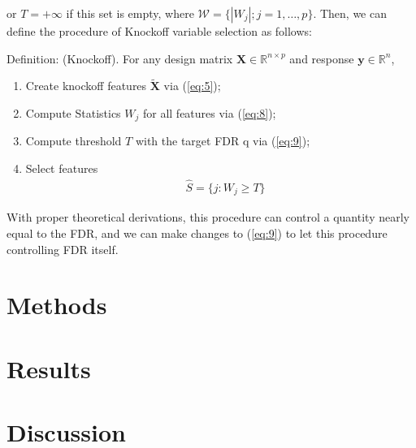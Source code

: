 \documentclass{uwstat572}
\begin{document}
or $T=+\infty$ if this set is empty, where $\mathcal{W} = \{|W_j|;j=1,\dots,p \}$. Then, we can define the procedure of Knockoff variable selection as follows:

{\sc Definition: }(Knockoff). For any design matrix $\bm{X}\in\mathbb{R}^{n\times p}$ and response $\bm{y}\in \mathbb{R}^n$, 
\begin{enumerate}
	\item Create knockoff features $\bm{\tilde X}$ via (\ref{eq:5});
	\item Compute Statistics $W_j$ for all features via (\ref{eq:8});
	\item Compute threshold $T$ with the target FDR q via (\ref{eq:9});
	\item Select features 
	\begin{align}\label{eq:10}
	& \hat{S} =\{j: W_j\geq T\}
	\end{align}
\end{enumerate}

With proper theoretical derivations, this procedure can control a quantity nearly equal to the FDR, and we can make changes to (\ref{eq:9}) to let this procedure controlling FDR itself.


\section{Methods}

\section{Results}

\section{Discussion}


\end{document}
